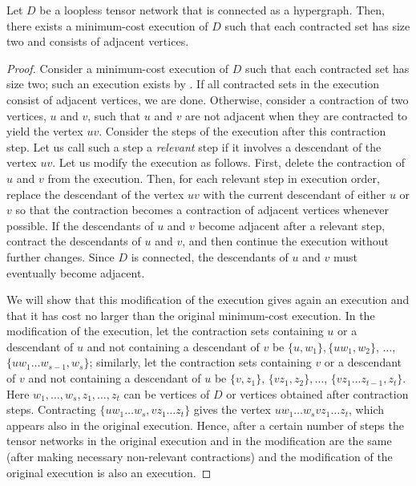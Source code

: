\documentclass{toc}
\begin{document}
\begin{lemma}
\label{lem:adjacent}
Let $D$ be a loopless tensor network that is connected as a hypergraph.
Then, there exists a minimum-cost execution of $D$ such that
each contracted set has size two and consists of adjacent vertices.
\end{lemma}
\begin{proof}
Consider a minimum-cost execution of $D$ such that each contracted
set has size two; such an execution exists by .
If all contracted sets in the execution consist of adjacent vertices,
we are done. Otherwise, consider a contraction of two vertices, $u$ and $v$,
such that $u$ and $v$ are not adjacent when they are
contracted to yield the vertex $uv$.
Consider the steps of the execution after this contraction step.
Let us call such a step a \emph{relevant} step
if it involves a descendant of the vertex $uv$. Let us modify the
execution as follows. First, delete the contraction of $u$ and $v$ from
the execution. Then, for each relevant step in execution order, replace
the descendant of the vertex $uv$ with the current descendant of
either $u$ or $v$ so that the contraction becomes a contraction of
adjacent vertices whenever possible. If the descendants of $u$ and $v$
become adjacent after a relevant step, contract the descendants
of $u$ and $v$, and then continue the execution without further changes.
Since $D$ is connected, the descendants of $u$ and $v$
must eventually become adjacent.

We will show that this modification of the execution gives again an execution and that it has cost no larger than the original minimum-cost
execution.
In the modification of the execution, let the contraction sets containing $u$ or a descendant of $u$ and not containing a descendant of $v$ be $\{u,w_1\},\{uw_1,w_2\}$, $\ldots$, $\{uw_1\ldots w_{s-1},w_s\}$; similarly, let the contraction sets containing $v$ or a descendant of $v$ and not containing a descendant of $u$ be $\{v,z_1\}$, $\{vz_1,z_2\},\ldots$, $\{vz_1\ldots z_{t-1},z_t\}$. Here $w_1,\ldots,w_s,z_1,\ldots,z_t$ can be vertices of $D$ or vertices obtained after contraction steps.  Contracting $\{uw_1\ldots w_s,vz_1 \ldots z_t\}$  gives the vertex $uw_1 \ldots w_s v z_1 \ldots z_t$, which  appears also in the original execution. Hence, after a certain number of steps the tensor networks in the original execution and in the modification are the same (after making necessary non-relevant contractions) and the modification of the original execution is also an execution.


\end{proof}
\end{document}
